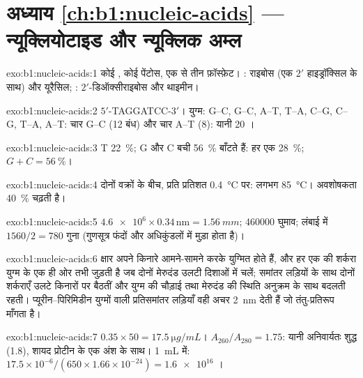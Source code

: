 \section*{अध्याय \ref{ch:b1:nucleic-acids} --- न्यूक्लियोटाइड और न्यूक्लिक अम्ल}

\begin{solution}{exo:b1:nucleic-acids:1}
कोई , कोई पेंटोस, एक से तीन फ़ॉस्फ़ेट। : राइबोस
(एक $2'$ हाइड्रॉक्सिल के साथ) और यूरैसिल; : $2'$-डिऑक्सीराइबोस और थाइमीन।
\end{solution}

\begin{solution}{exo:b1:nucleic-acids:2}
$5'$-TAGGATCC-$3'$। युग्म: G--C, G--C, A--T, T--A, C--G, C--G, T--A,
A--T: चार G--C (12 बंध) और चार A--T (8): यानी 20 ।
\end{solution}

\begin{solution}{exo:b1:nucleic-acids:3}
T \qty{22}{\%}; G और C बची \qty{56}{\%} बाँटते हैं: हर एक \qty{28}{\%};
$G + C = \qty{56}{\%}$।
\end{solution}

\begin{solution}{exo:b1:nucleic-acids:4}
दोनों वक्रों के बीच, प्रति प्रतिशत \qty{0.4}{\celsius} पर: लगभग
\qty{85}{\celsius}। अवशोषकता \qty{40}{\%} चढ़ती है।
\end{solution}

\begin{solution}{exo:b1:nucleic-acids:5}
$\num{4.6e6}\times 0.34\,\mathrm{nm} = \qty{1.56}{mm}$; \num{460000}
घुमाव; लंबाई में $1560/2 = 780$ गुना (गुणसूत्र फंदों और अधिकुंडलों में
मुड़ा होता है)।
\end{solution}

\begin{solution}{exo:b1:nucleic-acids:6}
क्षार अपने किनारे आमने-सामने करके युग्मित होते हैं, और हर एक की शर्करा
युग्म के एक ही ओर तभी जुड़ती है जब दोनों मेरुदंड उलटी दिशाओं में चलें;
समांतर लड़ियों के साथ दोनों शर्कराएँ उलटे किनारों पर बैठतीं और युग्म की
चौड़ाई तथा मेरुदंड की स्थिति अनुक्रम के साथ बदलती रहती।
प्यूरीन--पिरिमिडीन युग्मों वाली प्रतिसमांतर लड़ियाँ वही अचर \qty{2}{nm}
देती हैं जो तंतु-प्रतिरूप माँगता है।
\end{solution}

\begin{solution}{exo:b1:nucleic-acids:7}
$0.35\times 50 = \qty{17.5}{\micro g/mL}$। $A_{260}/A_{280} = 1.75$:
यानी अनिवार्यतः शुद्ध  (1.8), शायद प्रोटीन के एक अंश के साथ।
\qty{1}{mL} में: $17.5\times 10^{-6}/(650\times 1.66\times 10^{-24}) =
\num{1.6e16}$ ।
\end{solution}


